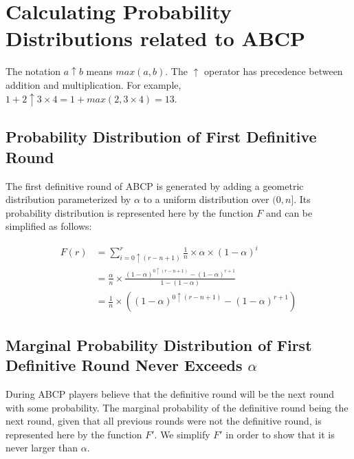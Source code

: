 \documentclass{dalcsthesis}
\begin{document}
\appendix
\chapter{Calculating Probability Distributions related to ABCP }
\label{Appendix:ABCP:Probabilities}

The notation $a \uparrow b$ means $max(a, b)$. The $\uparrow$ operator has precedence between addition and multiplication. For example, $1 + 2 \uparrow 3 \times 4 = 1 + max(2, 3 \times 4) = 13$.

\section{Probability Distribution of First Definitive Round}
\label{Appendix:ABCP:Probabilities:FirstDefinitiveRound}

The first definitive round of ABCP is generated by adding a geometric distribution parameterized by $\alpha$ to a uniform distribution over $(0, n]$. Its probability distribution is represented here by the function $F$ and can be simplified as follows:

\begin{align*}
F(r)
  &= \sum_{i=0 \uparrow (r-n+1)}^r \frac{1}{n} \times \alpha \times (1-\alpha)^i
\\&= \frac{\alpha}{n} \times \frac{(1-\alpha)^{0 \uparrow (r-n+1)} - (1-\alpha)^{r+1}}{1 - (1-\alpha)}
\\&= \frac{1}{n} \times ((1-\alpha)^{0 \uparrow (r-n+1)} - (1-\alpha)^{r+1})
\end{align*}

\section{Marginal Probability Distribution of First Definitive Round Never Exceeds $\alpha$}
\label{Appendix:ABCP:Probabilities:MarginalFirstDefinitiveRoundBelowAlpha}

During ABCP players believe that the definitive round will be the next round with some probability. The marginal probability of the definitive round being the next round, given that all previous rounds were not the definitive round, is represented here by the function $F'$. We simplify $F'$ in order to show that it is never larger than $\alpha$.
\end{document}
